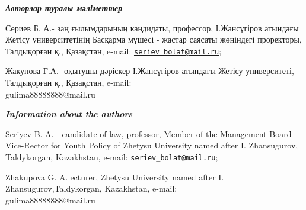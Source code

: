 \begin{authorinfo}
\emph{{\bfseries Авторлар туралы мәліметтер}}

Сериев Б. А.- заң ғылымдарының кандидаты, профессор, І.Жансүгіров
атындағы Жетісу университетінің Басқарма мүшесі - жастар саясаты
жөніндегі проректоры, Талдықорған қ., Қазақстан, e-mail:
\href{mailto:seriev_bolat@mail.ru}{\nolinkurl{seriev\_bolat@mail.ru}};

Жакупова Г.А.- оқытушы-дәріскер І.Жансүгіров атындағы Жетісу
университеті, Талдықорған қ., Қазақстан, e-mail: \\gulima88888888@mail.ru

\emph{{\bfseries Information about the authors}}

Seriyev B. A. - candidate of law, professor, Member of the Management
Board - Vice-Rector for Youth Policy of Zhetysu University named after
I. Zhansugurov, Taldykorgan, Kazakhstan, e-mail:
\href{mailto:seriev_bolat@mail.ru}{\nolinkurl{seriev\_bolat@mail.ru}};

Zhakupova G. A.lecturer, Zhetysu University named after I.
Zhansugurov,Taldykorgan, Kazakhstan, e-mail: \\gulima88888888@mail.ru
\end{authorinfo}
